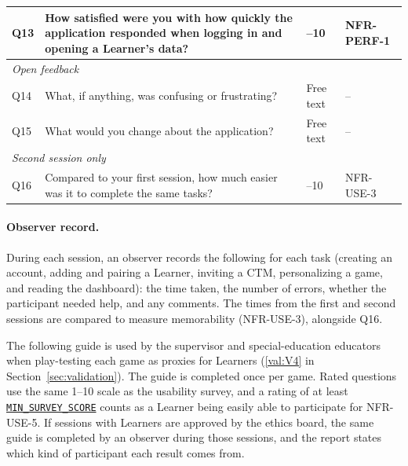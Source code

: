 \documentclass[12pt, titlepage]{article}
\newcommand{\srsref}[1]{#1}
\newcounter{validation}
\newcommand{\valref}[1]{\hyperref[val:V#1]{\ref*{val:V#1}}}
\newcommand{\paramref}[2]{\hyperlink{param:#1}{\texttt{#2}}}
\begin{document}
\begin{table}[htbp]
\begin{tabularx}{\textwidth}{l >{\raggedright\arraybackslash}X >{\raggedright\arraybackslash}p{} >{\raggedright\arraybackslash}p{}}
Q13 & How satisfied were you with how quickly the application responded when logging in and opening a Learner's data? & 1--10 & \srsref{NFR-PERF-1}\\
\midrule
\multicolumn{4}{l}{\emph{Open feedback}}\\
Q14 & What, if anything, was confusing or frustrating? & Free text & --\\
Q15 & What would you change about the application? & Free text & --\\
\midrule
\multicolumn{4}{l}{\emph{Second session only}}\\
Q16 & Compared to your first session, how much easier was it to complete the same tasks? & 1--10 & \srsref{NFR-USE-3}\\
\bottomrule
\end{tabularx}
\end{table}

\paragraph{Observer record.} During each session, an observer records the following for each task (creating an account, adding and pairing a Learner, inviting a CTM, personalizing a game, and reading the dashboard): the time taken, the number of errors, whether the participant needed help, and any comments. The times from the first and second sessions are compared to measure memorability (\srsref{NFR-USE-3}), alongside Q16.

The following guide is used by the supervisor and special-education educators when play-testing each game as proxies for Learners (\valref{4} in Section~\ref{sec:validation}). The guide is completed once per game. Rated questions use the same 1--10 scale as the usability survey, and a rating of at least \paramref{min-survey-score}{MIN\_SURVEY\_SCORE} counts as a Learner being easily able to participate for \srsref{NFR-USE-5}. If sessions with Learners are approved by the ethics board, the same guide is completed by an observer during those sessions, and the report states which kind of participant each result comes from.
\end{document}
